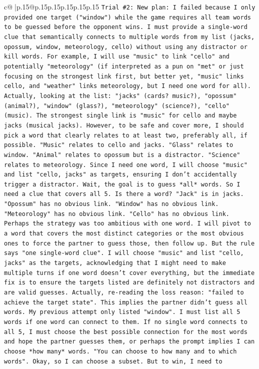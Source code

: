 \documentclass{article}
\begin{document}
{\begin{supertabular}{c@{$\;$}|p{.15\linewidth}@{}p{.15\linewidth}p{.15\linewidth}p{.15\linewidth}p{.15\linewidth}p{.15\linewidth}}
{{{\texttt{Trial \#2: New plan: I failed because I only provided one target ("window") while the game requires all team words to be guessed before the opponent wins. I must provide a single{-}word clue that semantically connects to multiple words from my list (jacks, opossum, window, meteorology, cello) without using any distractor or kill words. For example, I will use "music" to link "cello" and potentially "meteorology" (if interpreted as a pun on "met" or just focusing on the strongest link first, but better yet, "music" links cello, and "weather" links meteorology, but I need one word for all). Actually, looking at the list: "jacks" (cards? music?), "opossum" (animal?), "window" (glass?), "meteorology" (science?), "cello" (music). The strongest single link is "music" for cello and maybe jacks (musical jacks). However, to be safe and cover more, I should pick a word that clearly relates to at least two, preferably all, if possible. "Music" relates to cello and jacks. "Glass" relates to window. "Animal" relates to opossum but is a distractor. "Science" relates to meteorology. Since I need one word, I will choose "music" and list "cello, jacks" as targets, ensuring I don't accidentally trigger a distractor. Wait, the goal is to guess *all* words. So I need a clue that covers all 5. Is there a word? "Jack" is in jacks. "Opossum" has no obvious link. "Window" has no obvious link. "Meteorology" has no obvious link. "Cello" has no obvious link. Perhaps the strategy was too ambitious with one word. I will pivot to a word that covers the most distinct categories or the most obvious ones to force the partner to guess those, then follow up. But the rule says "one single{-}word clue". I will choose "music" and list "cello, jacks" as the targets, acknowledging that I might need to make multiple turns if one word doesn't cover everything, but the immediate fix is to ensure the targets listed are definitely not distractors and are valid guesses. Actually, re{-}reading the loss reason: "failed to achieve the target state". This implies the partner didn't guess all words. My previous attempt only listed "window". I must list all 5 words if one word can connect to them. If no single word connects to all 5, I must choose the best possible connection for the most words and hope the partner guesses them, or perhaps the prompt implies I can choose *how many* words. "You can choose to how many and to which words". Okay, so I can choose a subset. But to win, I need to} \\
\\ 
\\ 
}}}
\end{supertabular}}
\end{document}

